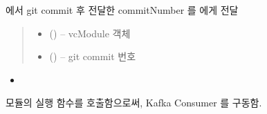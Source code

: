 \documentclass[a4paper,10pt,english]{sphinxmanual}
\begin{document}
\begin{fulllineitems}
\begin{fulllineitems}
\end{fulllineitems}


\begin{fulllineitems}
\label{\detokenize{_VCModule:vcModule.reportCommit}}
\pysigstartsignatures
{}
\pysigstopsignatures
\sphinxAtStartPar
{} 에서 git commit 후 전달한 commitNumber 를  에게 전달
\begin{quote}\begin{description}
\begin{itemize}
\item {} 
\sphinxAtStartPar
{} ({\hyperref[\detokenize{_VCModule:vcModule}]{}}) – vcModule 객체

\item {} 
\sphinxAtStartPar
{} () – git commit 번호

\end{itemize}

\end{description}\end{quote}


\nopagebreak

\begin{itemize}
\item {} 
\sphinxAtStartPar
{\hyperref[\detokenize{_SessionManager:SessionManager._vcListener}]{}}

\end{itemize}



\end{fulllineitems}


\begin{fulllineitems}
\label{\detokenize{_VCModule:vcModule.run}}
\pysigstartsignatures
{}
\pysigstopsignatures
\sphinxAtStartPar
{} 모듈의 실행 함수를 호출함으로써, Kafka Consumer 를 구동함.


\end{fulllineitems}
\end{fulllineitems}
\end{document}
